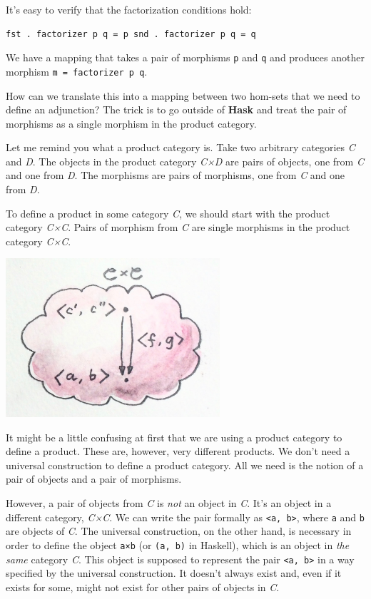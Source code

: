 It's easy to verify that the factorization conditions hold:

\begin{verbatim}
fst . factorizer p q = p snd . factorizer p q = q
\end{verbatim}

We have a mapping that takes a pair of morphisms \texttt{p} and
\texttt{q} and produces another morphism
\texttt{m\ =\ factorizer\ p\ q}.

How can we translate this into a mapping between two hom-sets that we
need to define an adjunction? The trick is to go outside of
\textbf{Hask} and treat the pair of morphisms as a single morphism in
the product category.

Let me remind you what a product category is. Take two arbitrary
categories \emph{C} and \emph{D}. The objects in the product category
\emph{C×D} are pairs of objects, one from \emph{C} and one from
\emph{D}. The morphisms are pairs of morphisms, one from \emph{C} and
one from \emph{D}.

To define a product in some category \emph{C}, we should start with the
product category \emph{C×C}. Pairs of morphism from \emph{C} are single
morphisms in the product category \emph{C×C}.

\includegraphics[width=3.12500in]{images/adj-productcat.jpg}

It might be a little confusing at first that we are using a product
category to define a product. These are, however, very different
products. We don't need a universal construction to define a product
category. All we need is the notion of a pair of objects and a pair of
morphisms.

However, a pair of objects from \emph{C} is \emph{not} an object in
\emph{C}. It's an object in a different category, \emph{C×C}. We can
write the pair formally as \texttt{\textless{}a,\ b\textgreater{}},
where \texttt{a} and \texttt{b} are objects of \emph{C}. The universal
construction, on the other hand, is necessary in order to define the
object \texttt{a×b} (or \texttt{(a,\ b)} in Haskell), which is an object
in \emph{the same} category \emph{C}. This object is supposed to
represent the pair \texttt{\textless{}a,\ b\textgreater{}} in a way
specified by the universal construction. It doesn't always exist and,
even if it exists for some, might not exist for other pairs of objects
in \emph{C}.

